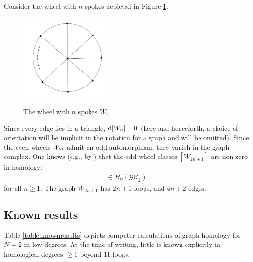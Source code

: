 \documentclass[pdftex]{sigma}%
\numberwithin{equation}{section}
\newcommand{\GC}{\mathcal{GC}}
\newcommand{\0}{\color{blue}{\mathsf{0}}}
\begin{document}
 Consider the wheel with $n$ spokes depicted in Figure \ref{figWheel}.
 \begin{figure}[h]
\centering
{\includegraphics[width=4.8cm]{WheelN.pdf}}
 \caption{The wheel with $n$ spokes $W_n$.} \label{figWheel} \end{figure}
Since every edge lies in a triangle, ${\rm d}[W_n]=0$ (here and henceforth, a choice of orientation will be implicit in the notation for a graph and will be omitted). Since the even wheels $W_{2k}$ admit an odd automorphism, they vanish in the graph complex. One knows (e.g., by \cite{SpectralSequenceGC2}) that the odd wheel classes $[W_{2n+1}] $ are non-zero in homology:
\begin{gather*}
[W_{2n+1} ] \in H_0(\GC_2)
\end{gather*}
for all $n \geq 1$. The graph $W_{2n+1}$ has $2n+1$ loops, and $4n+2$ edges.

\subsection{Known results}
Table \ref{table:knownresults} depicts computer calculations of graph homology for $N=2$ in low degrees. At the time of writing, little is known explicitly in homological degrees $\geq 1$ beyond $11$ loops.
\end{document}
